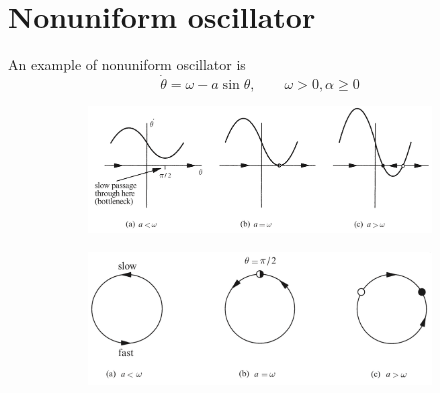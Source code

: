 \documentclass[12pt, openany]{report}
\theoremstyle{definition}
\begin{document}
\section{Nonuniform oscillator}
An example of nonuniform oscillator is 
\begin{equation}
    \dot \theta = \omega - a\sin \theta, \qquad \omega >0, \alpha \ge 0
\end{equation}
\begin{figure}[H]
    \centering
    \begin{subfigure}[b]{.5\textwidth}
        \includegraphics[width=\textwidth]{img/sin.png}
    \end{subfigure}
    \begin{subfigure}[b]{.5\textwidth}
        \includegraphics[width=\textwidth]{img/sin_2.png}
    \end{subfigure}
\end{figure}
\end{document}
